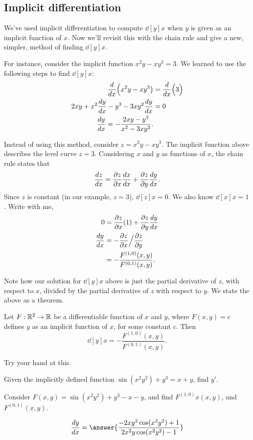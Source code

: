 \documentclass{ximera}
\begin{document}
\subsection{Implicit differentiation}

We've used implicit differentiation to compute $\dd[y]{x}$ when $y$ is
given as an implicit function of $x$. Now we'll revisit this with the
chain rule and give a new, simpler, method of finding $\dd[y]{x}$.

For instance, consider the implicit function $x^2y-xy^3=3$. We learned
to use the following steps to find $\dd[y]{x}$:
\begin{align*}
\ddx\Big(x^2y-xy^3\big) &= \ddx\Big(3\Big) \\
2xy + x^2\dd[y]{x}-y^3-3xy^2\dd[y]{x} &= 0\\
\dd[y]{x} = -\frac{2xy-y^3}{x^2-3xy^2}.
\end{align*}
     
Instead of using this method, consider $z=x^2y-xy^3$. The implicit
function above describes the level curve $z=3$. Considering $x$ and
$y$ as functions of $x$, the chain rule states that
\[
\dd[z]{x} = \pp[z]{x}\dd[x]{x}+\pp[z]{y}\dd[y]{x}.
\]
Since $z$ is constant (in our example, $z=3$), $\dd[z]{x} = 0$. We
also know $\dd[x]{x} = 1$. Write with me,
\begin{align*}
  0 &= \pp[z]{x}(1) + \pp[z]{y}\dd[y]{x} \\
  \dd[y]{x} &= -\pp[z]{x}\Big/\pp[z]{y}\\
  &= -\frac{F^{(1,0)}(x,y)}{F^{(0,1)}(x,y)}.
\end{align*}

Note how our solution for $\dd[y]{x}$ above is just the partial
derivative of $z$, with respect to $x$, divided by the partial
derivative of $z$ with respect to $y$.  We state the above as a
theorem.

\begin{theorem}
  Let $F:\R^2\to\R$ be a differentiable function of $x$ and $y$, where
  $F(x,y)=c$ defines $y$ as an implicit function of $x$, for some
  constant $c$. Then 
  \[
  \dd[y]{x} = -\frac{F^{(1,0)}(x,y)}{F^{(0,1)}(x,y)}.
  \]
\end{theorem}

Try your hand at this.

\begin{question}
  Given the implicitly defined function $\sin(x^2y^2)+y^3=x+y$, find
  $y'$.
  \begin{hint}
    Consider $F(x,y) = \sin(x^2y^2)+y^3-x-y$, and find
    $F^{(1,0)}x(x,y)$, and $F^{(0,1)}(x,y)$.
  \end{hint}
  \begin{prompt}
  \[
  \dd[y]{x} = \answer{\frac{-2xy^2\cos(x^2y^2)+1}{2x^2y\cos(x^2y^2)-1}}
  \]
  \end{prompt}
\end{question}

\end{document}
